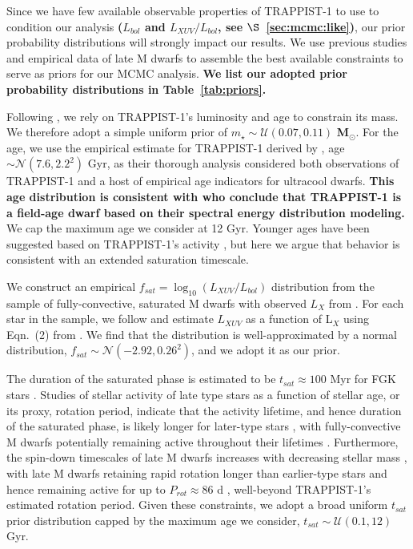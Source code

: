 \documentclass[twocolumn]{aastex62}
\def\gsim{~\rlap{$>$}{\lower 1.0ex\hbox{$\sim$}}}
\newcommand{\xxx}[1]{{\textbf{#1}}}
\begin{document}
Since we have few available observable properties of TRAPPIST-1 to use to condition our analysis \xxx{($L_{bol}$ and $L_{XUV}/L_{bol}$, see $\S$~\ref{sec:mcmc:like})}, our prior probability distributions will strongly impact our results. We use previous studies and empirical data of late M dwarfs to assemble the best available constraints to serve as priors for our MCMC analysis. \xxx{We list our adopted prior probability distributions in Table~\ref{tab:priors}.}

Following \citet{vanGrootel2018}, we rely on TRAPPIST-1's luminosity and age to constrain its mass. We therefore adopt a simple uniform prior of $m_{\star} \sim \mathcal{U}(0.07, 0.11)$ \xxx{M$_{\odot}$}. For the age, we use the empirical estimate for TRAPPIST-1 derived by \citet{Burgasser2017}, age $\sim \mathcal{N}(7.6, 2.2^2)$ Gyr, as their thorough analysis considered both observations of TRAPPIST-1 and a host of empirical age indicators for ultracool dwarfs. \xxx{This age distribution is consistent with \citet{Gonzales2019} who conclude that TRAPPIST-1 is a field-age dwarf based on their spectral energy distribution modeling.} We cap the maximum age we consider at 12 Gyr. Younger ages have been suggested based on TRAPPIST-1's activity \citep[e.g.~$\gsim 500$ Myr,][]{Bourrier2017b}, but here we argue that behavior is consistent with an extended saturation timescale.

We construct an empirical $f_{sat} = \log_{10}(L_{XUV}/L_{bol})$ distribution from the sample of fully-convective, saturated M dwarfs with observed $L_{X}$ from \citet{Wright2011}. For each star in the \citet{Wright2011} sample, we follow \citet{Wheatley2017} and estimate $L_{XUV}$ as a function of L$_{X}$ using Eqn.~(2) from \citet{Chadney2015}. We find that the distribution is well-approximated by a normal distribution, $f_{sat} \sim \mathcal{N}(-2.92, 0.26^2)$, and we adopt it as our prior.  

The duration of the saturated phase is estimated to be $t_{sat} \approx 100$ Myr for FGK stars \citep{Jackson2012}. Studies of stellar activity of late type stars as a function of stellar age, or its proxy, rotation period, indicate that the activity lifetime, and hence duration of the saturated phase, is likely longer for later-type stars \citep{Shkolnik2014,Wright2011,West2015}, with fully-convective M dwarfs potentially remaining active throughout their lifetimes \citep[$t_{sat} \gsim 7$ Gyr,][]{West2008,Schneider2018}. Furthermore, the spin-down timescales of late M dwarfs increases with decreasing stellar mass \citep{Delfosse1998}, with late M dwarfs retaining rapid rotation longer than earlier-type stars and hence remaining active for up to $P_{rot} \approx 86$ d \citep{West2015}, well-beyond TRAPPIST-1's estimated rotation period. Given these constraints, we adopt a broad uniform $t_{sat}$ prior distribution capped by the maximum age we consider, $t_{sat} \sim \mathcal{U}(0.1, 12)$ Gyr. 
\end{document}
